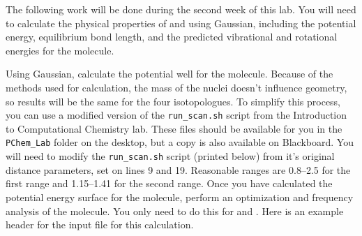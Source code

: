 \documentclass[nobib,nofonts,nols,nohyper]{tufte-handout}
\begin{document}
The following work will be done during the second week of this lab. 
You will need to calculate the physical properties of  and  using Gaussian\autocite{gaussian16}, including the potential energy, equilibrium bond length, and the predicted vibrational and rotational energies for the molecule.

Using Gaussian, calculate the potential well for the  molecule. 
Because of the methods used for calculation, the mass of the nuclei doesn't influence geometry, so results will be the same for the four isotopologues. 
To simplify this process, you can use a modified version of the \Verb|run_scan.sh| script from the Introduction to Computational Chemistry lab.
These files should be available for you in the \Verb|PChem_Lab| folder on the desktop, but a copy is also available on Blackboard. 
You will need to modify the \Verb|run_scan.sh| script (printed below) from it's original distance parameters, set on lines \num{9} and \num{19}. 
Reasonable ranges are \numrange{0.8}{2.5} for the first range and \numrange{1.15}{1.41} for the second range. 
%
%
Once you have calculated the potential energy surface for the molecule, perform an optimization and frequency analysis of the  molecule. 
You only need to do this for  and . 
Here is an example header for the input file for this calculation. 
%
\end{document}

